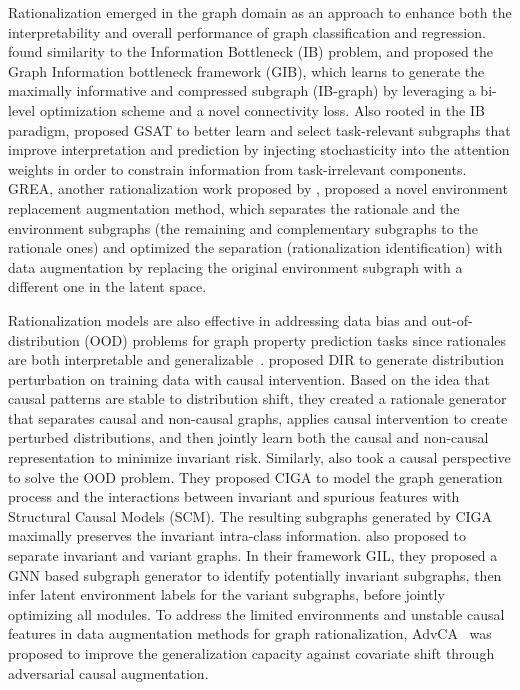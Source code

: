 \documentclass[11pt]{article}
\begin{document}
Rationalization emerged in the graph domain as an approach to enhance both the interpretability and overall performance of graph classification and regression.
\citet{yu2020graph} found similarity to the Information Bottleneck (IB) problem, and proposed the Graph Information bottleneck framework (GIB), which learns to generate the maximally informative and compressed subgraph (IB-graph) by leveraging a bi-level optimization scheme and a novel connectivity loss. Also rooted in the IB paradigm, \citet{miao2022interpretable} proposed GSAT to better learn and select task-relevant subgraphs that improve interpretation and prediction by injecting stochasticity into the attention weights in order to constrain information from task-irrelevant components.
GREA, another rationalization work proposed by \citet{liu2022graph}, proposed a novel environment replacement augmentation method, which separates the rationale and the environment subgraphs (the remaining and complementary subgraphs to the rationale ones) and optimized the separation (rationalization identification) with data augmentation by replacing the original environment subgraph with a different one in the latent space.

Rationalization models are also effective in addressing data bias and out-of-distribution (OOD) problems for graph property prediction tasks since rationales are both interpretable and generalizable~\cite{miao2022interpretable}. \citet{wu2021discovering} proposed DIR to generate distribution perturbation on training data with causal intervention. Based on the idea that causal patterns are stable to distribution shift, they created a rationale generator that separates causal and non-causal graphs, applies causal intervention to create perturbed distributions, and then jointly learn both the causal and non-causal representation to minimize invariant risk. Similarly, \citet{chenlearning} also took a causal perspective to solve the OOD problem. They proposed CIGA to model the graph generation process and the interactions between invariant and spurious features with Structural Causal Models (SCM). The resulting subgraphs generated by CIGA maximally preserves the invariant intra-class information. \citet{li2022learning} also proposed to separate invariant and variant graphs. In their framework GIL, they proposed a GNN based subgraph generator to identify potentially invariant subgraphs, then infer latent environment labels for the variant subgraphs, before jointly optimizing all modules. To address the limited environments and unstable causal
features in data augmentation methods for graph rationalization, AdvCA~\cite{sui2022adversarial} was proposed to improve the generalization capacity against covariate shift through adversarial causal augmentation.
\end{document}
